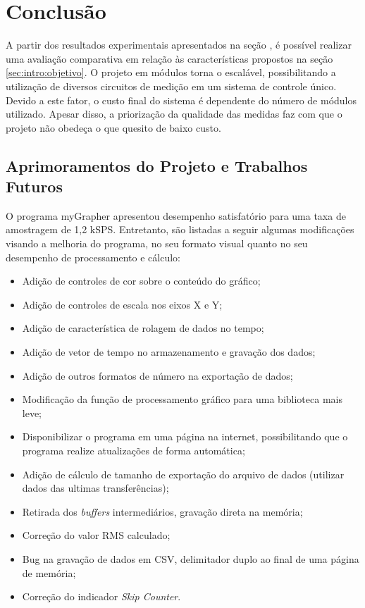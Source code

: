 \chapter{Conclusão}\label{cap:conclusao}

	A partir dos resultados experimentais apresentados na seção \xx, é possível realizar uma avaliação comparativa em relação às características propostos na seção \ref{sec:intro:objetivo}. O projeto em módulos torna o escalável, possibilitando a utilização de diversos circuitos de medição em um sistema de controle único. Devido a este fator, o custo final do sistema é dependente do número de módulos utilizado. Apesar disso, a priorização da qualidade das medidas faz com que o projeto não obedeça o que quesito de baixo custo.


	\section{Aprimoramentos do Projeto e Trabalhos Futuros}\label{sec:conclusao:melhoras}

	O programa myGrapher apresentou desempenho satisfatório para uma taxa de amostragem de 1,2 kSPS. Entretanto, são listadas a seguir algumas modificações visando a melhoria do programa, no seu formato visual quanto no seu desempenho de processamento e cálculo:

		\begin{itemize}
			\item Adição de controles de cor sobre o conteúdo do gráfico;
			\item Adição de controles de escala nos eixos X e Y;
			\item Adição de característica de rolagem de dados no tempo;
			\item Adição de vetor de tempo no armazenamento e gravação dos dados;
			\item Adição de outros formatos de número na exportação de dados;
			\item Modificação da função de processamento gráfico para uma biblioteca mais leve;
			\item Disponibilizar o programa em uma página na internet, possibilitando que o programa realize atualizações de forma automática;
			\item Adição de cálculo de tamanho de exportação do arquivo de dados (utilizar dados das ultimas transferências);
			\item Retirada dos \textit{buffers} intermediários, gravação direta na memória;
			\item Correção do valor RMS calculado;
			\item Bug na gravação de dados em CSV, delimitador duplo ao final de uma página de memória;
			\item Correção do indicador \textit{Skip Counter}.
		\end{itemize}

